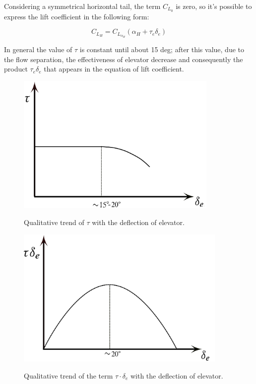  
Considering a symmetrical horizontal tail, the term $C_{L_0}$ is zero, so it's possible to express the lift coefficient in the following form:


\begin{equation}
C_{L_H}= C_{L_{{\alpha}_H}} \left ( \alpha_H + \tau_e \delta_e \right)
\end{equation}
  		
 In general the value of $\tau$ is constant until about 15 deg; after this value, due to the flow separation, the effectiveness of elevator decrease and consequently the product $ \tau_e \delta_e$ that appears in the equation of lift coefficient.
		


\begin{figure}[H]
\centering
{\includegraphics[height=6.79cm]{Immagini/taude.png}} 
\label{tau1}
\caption{Qualitative trend of $\tau$ with the deflection of elevator.}
\end{figure} 		


\begin{figure}[H]
\centering
{\includegraphics[height=6.79cm]{Immagini/taudeltae.png}} 
\label{tau2}
\caption{Qualitative trend of the term $\tau \cdot \delta_e$ with the deflection of elevator.}
\end{figure} 		



